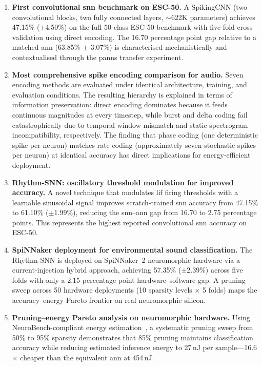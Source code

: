 \begin{enumerate}[label=\textbf{C\arabic*},leftmargin=2cm]

\item \textbf{First convolutional \gls{snn} benchmark on ESC-50.}
A SpikingCNN (two convolutional blocks, two fully connected layers, ${\sim}$622K parameters) achieves 47.15\% ($\pm$4.50\%) on the full 50-class ESC-50 benchmark with five-fold cross-validation using direct encoding.
The 16.70 percentage point gap relative to a matched \gls{ann} (63.85\% $\pm$ 3.07\%) is characterised mechanistically and contextualised through the \gls{panns} transfer experiment.

\item \textbf{Most comprehensive spike encoding comparison for audio.}
Seven encoding methods are evaluated under identical architecture, training, and evaluation conditions.
The resulting hierarchy is explained in terms of information preservation: direct encoding dominates because it feeds continuous magnitudes at every timestep, while burst and delta coding fail catastrophically due to temporal window mismatch and static-spectrogram incompatibility, respectively.
The finding that phase coding (one deterministic spike per neuron) matches rate coding (approximately seven stochastic spikes per neuron) at identical accuracy has direct implications for energy-efficient deployment.

\item \textbf{Rhythm-SNN: oscillatory threshold modulation for improved accuracy.}
A novel technique that modulates \gls{lif} firing thresholds with a learnable sinusoidal signal improves scratch-trained \gls{snn} accuracy from 47.15\% to 61.10\% ($\pm$1.99\%), reducing the \gls{snn}--\gls{ann} gap from 16.70 to 2.75 percentage points.
This represents the highest reported convolutional \gls{snn} accuracy on ESC-50.

\item \textbf{SpiNNaker deployment for environmental sound classification.}
The Rhythm-SNN is deployed on SpiNNaker~2 neuromorphic hardware via a current-injection hybrid approach, achieving 57.35\% ($\pm$2.39\%) across five folds with only a 2.15 percentage point hardware--software gap.
A pruning sweep across 50 hardware deployments (10 sparsity levels $\times$ 5 folds) maps the accuracy--energy Pareto frontier on real neuromorphic silicon.

\item \textbf{Pruning--energy Pareto analysis on neuromorphic hardware.}
Using NeuroBench-compliant energy estimation~\citep{yik2025neurobench}, a systematic pruning sweep from 50\% to 95\% sparsity demonstrates that 85\% pruning maintains classification accuracy while reducing estimated inference energy to 27\,nJ per sample---16.6$\times$ cheaper than the equivalent \gls{ann} at 454\,nJ.


\end{enumerate}

